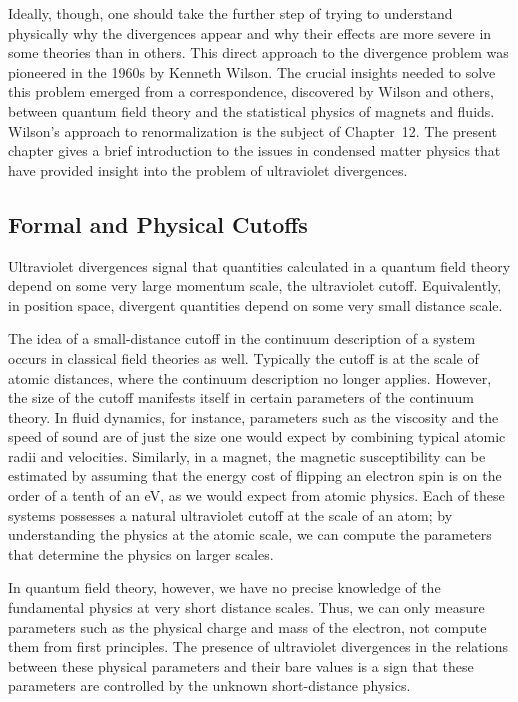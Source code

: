 Ideally, though, one should take the further step of trying to understand
physically why the divergences appear and why their effects are more severe in
some theories than in others.  This direct approach to the divergence problem
was pioneered in the 1960s by Kenneth Wilson.  The crucial insights needed to
solve this problem emerged from a correspondence, discovered by Wilson and
others, between quantum field theory and the statistical physics of magnets
and fluids.  Wilson's approach to renormalization is the subject of
Chapter~12.  The present chapter gives a brief introduction to the issues in
condensed matter physics that have provided insight into the problem of
ultraviolet divergences.

\subsection*{Formal and Physical Cutoffs}

Ultraviolet divergences signal that quantities calculated in a quantum field
theory depend on some very large momentum scale, the ultraviolet cutoff.
Equivalently, in position space, divergent quantities depend on some very
small distance scale.

The idea of a small-distance cutoff in the continuum description of a system
occurs in classical field theories as well.  Typically the cutoff is at the
scale of atomic distances, where the continuum description no longer applies.
However, the size of the cutoff manifests itself in certain parameters of the
continuum theory.  In fluid dynamics, for instance, parameters such as the
viscosity and the speed of sound are of just the size one would expect by
combining typical atomic radii and velocities.  Similarly, in a magnet, the
magnetic susceptibility can be estimated by assuming that the energy cost of
flipping an electron spin is on the order of a tenth of an eV, as we would
expect from atomic physics.  Each of these systems possesses a natural
ultraviolet cutoff at the scale of an atom; by understanding the physics at
the atomic scale, we can compute the parameters that determine the physics on
larger scales.

In quantum field theory, however, we have no precise knowledge of the
fundamental physics at very short distance scales.  Thus, we can only measure
parameters such as the physical charge and mass of the electron, not compute
them from first principles.  The presence of ultraviolet divergences in the
relations between these physical parameters and their bare values is a sign
that these parameters are controlled by the unknown short-distance physics.

